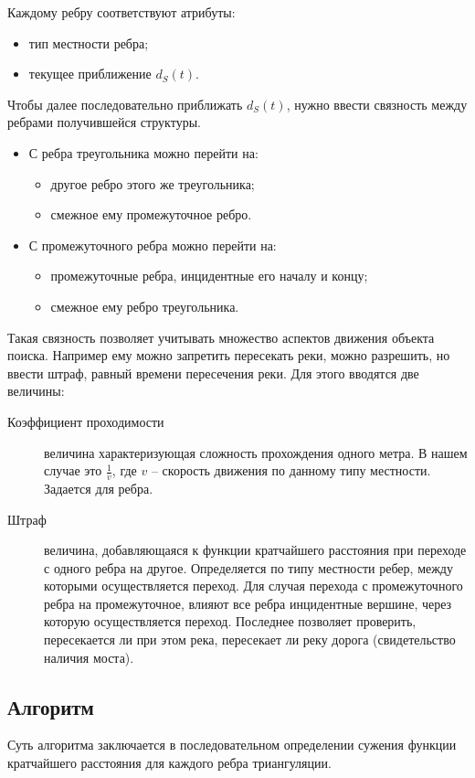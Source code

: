 Каждому ребру соответствуют атрибуты:
\begin{itemize}
\item тип местности ребра;
\item текущее приближение $d_S(t)$.
\end{itemize}

Чтобы далее последовательно приближать $d_S(t)$, нужно ввести связность между
ребрами получившейся структуры.
\begin{itemize}
\item С ребра треугольника можно перейти на:
  \begin{itemize}
  \item другое ребро этого же треугольника;
  \item смежное ему промежуточное ребро.
  \end{itemize}
\item С промежуточного ребра можно перейти на:
  \begin{itemize}
  \item промежуточные ребра, инцидентные его началу и концу;
  \item смежное ему ребро треугольника.
  \end{itemize}
\end{itemize}

Такая связность позволяет учитывать множество аспектов движения
объекта поиска. Например ему можно запретить пересекать реки,
можно разрешить, но ввести штраф, равный времени пересечения реки.
Для этого вводятся две величины:
\begin{description}
\item[Коэффициент проходимости] величина характеризующая сложность прохождения
одного метра. В нашем случае это $\frac{1}{v}$, где $v$ -- скорость движения
по данному типу местности. Задается для ребра.
\item[Штраф] величина, добавляющаяся к функции кратчайшего расстояния при
переходе с одного ребра на другое. Определяется по типу местности ребер,
между которыми осуществляется переход. Для случая перехода с промежуточного
ребра на промежуточное, влияют все ребра инцидентные вершине, через которую
осуществляется переход. Последнее позволяет проверить, пересекается ли при
этом река, пересекает ли реку дорога (свидетельство наличия моста).
\end{description}


\subsection{Алгоритм}
Суть алгоритма заключается в последовательном определении сужения функции
кратчайшего расстояния для каждого ребра триангуляции.


